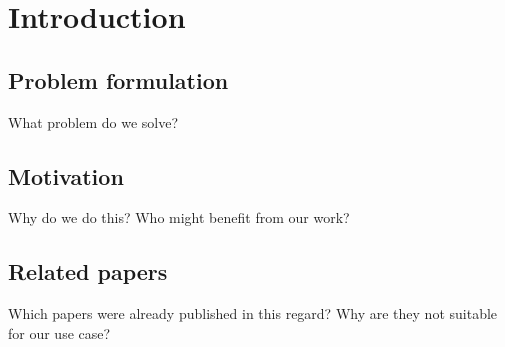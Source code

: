 \section{Introduction}

\subsection{Problem formulation}
What problem do we solve?


\subsection{Motivation}
Why do we do this?
Who might benefit from our work?


\subsection{Related papers}
Which papers were already published in this regard?
Why are they not suitable for our use case?
